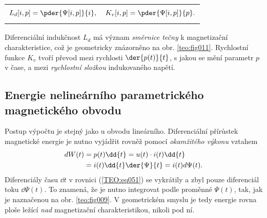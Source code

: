       \noindent\begin{tabularx}{\linewidth}{@{}XX@{}}
        \begin{equation}\label{TEO:eq049}
           L_d[i,p]=\pder{\Psi[i, p]}{i},
        \end{equation} & 
        \begin{equation}\label{TEO:eq050}
           K_v[i,p] = \pder{\Psi[i, p]}{p}.
        \end{equation} 
      \end{tabularx}
      
      Diferenciální indukčnost \(L_d\) má význam \emph{směrnice tečny} k magnetizační 
      charakteristice, což je geometricky znázorněno na obr. \ref{teo:fig011}. Rychlostní funkce 
      \(K_v\) tvoří převod mezi rychlosti \(\der{p(t)}{t}\), s jakou se mění parametr \(p\) v 
      čase, a mezi \emph{rychlostní složkou} indukovaného napětí.

        
      
    \subsection{Energie nelineárního parametrického magnetického obvodu}
     Postup výpočtu je stejný jako u obvodu lineárního. Diferenciální přírůstek magnetické energie 
     je nutno vyjádřit rovněž pomocí \emph{okamžitého výkonu} vztahem
      \begin{align}\label{TEO:eq051}
        dW(t) &= p(t)\dd{t} = u(t)\cdot i(t)\dd{t}     \nonumber \\
              &= i(t)\dd{t}\der{\Psi}{t} = i(t)d\Psi(t).
      \end{align}
      Diferenciály času \(\dd{t}\) v rovnici (\ref{TEO:eq051}) se vykrátily a zbyl pouze 
      diferenciál toku \(\dd{\Psi(t)}\). To znamená, že je nutno integrovat podle proměnné 
      \(\Psi(t)\), tak, jak je naznačenou na obr. \ref{teo:fig009}. V geometrickém smyslu je tedy 
      energie rovna ploše ležící \emph{nad} magnetizační charakteristikou, nikoli pod ní.
      
